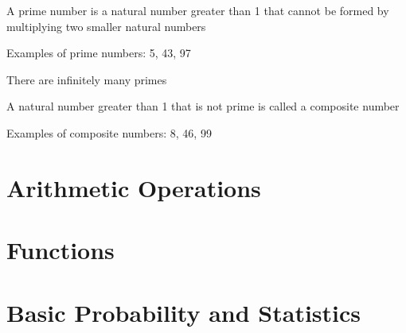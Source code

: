 \documentclass[8pt,a4paper,compress]{beamer}
\begin{document}
\begin{frame}[fragile]
\pause\transdissolve

A prime number is a natural number greater than 1 that cannot be formed by multiplying two smaller natural numbers

\pause\transdissolve\bigskip

Examples of prime numbers: 5, 43, 97

\pause\transdissolve\bigskip

There are infinitely many primes

\pause\transdissolve\bigskip

A natural number greater than 1 that is not prime is called a composite number

\pause\transdissolve\bigskip

Examples of composite numbers: 8, 46, 99
\end{frame}

\section{Arithmetic Operations}
\begin{frame}[fragile]
\pause\transdissolve

\end{frame}

\section{Functions}
\begin{frame}[fragile]
\pause\transdissolve

\end{frame}

\section{Basic Probability and Statistics}
\begin{frame}[fragile]
\pause\transdissolve

\end{frame}
\end{document}
